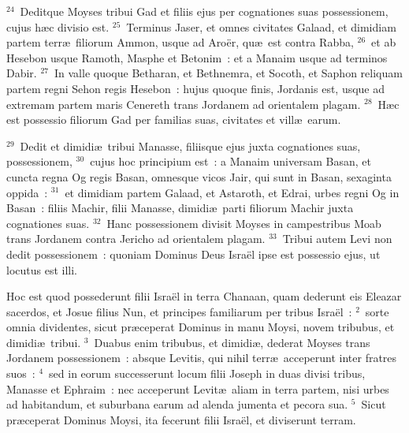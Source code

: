 ${}^{24}$~Deditque Moyses tribui Gad et filiis ejus per cognationes suas possessionem, cujus h\ae c divisio est.
${}^{25}$~Terminus Jaser, et omnes civitates Galaad, et dimidiam partem terr\ae\ filiorum Ammon, usque ad Aro\"er, qu\ae\ est contra Rabba,
${}^{26}$~et ab Hesebon usque Ramoth, Masphe et Betonim~: et a Manaim usque ad terminos Dabir.
${}^{27}$~In valle quoque Betharan, et Bethnemra, et Socoth, et Saphon reliquam partem regni Sehon regis Hesebon~: hujus quoque finis, Jordanis est, usque ad extremam partem maris Cenereth trans Jordanem ad orientalem plagam.
${}^{28}$~H\ae c est possessio filiorum Gad per familias suas, civitates et vill\ae\ earum.


${}^{29}$~Dedit et dimidi\ae\ tribui Manasse, filiisque ejus juxta cognationes suas, possessionem,
${}^{30}$~cujus hoc principium est~: a Manaim universam Basan, et cuncta regna Og regis Basan, omnesque vicos Jair, qui sunt in Basan, sexaginta oppida~:
${}^{31}$~et dimidiam partem Galaad, et Astaroth, et Edrai, urbes regni Og in Basan~: filiis Machir, filii Manasse, dimidi\ae\ parti filiorum Machir juxta cognationes suas.
${}^{32}$~Hanc possessionem divisit Moyses in campestribus Moab trans Jordanem contra Jericho ad orientalem plagam.
${}^{33}$~Tribui autem Levi non dedit possessionem~: quoniam Dominus Deus Isra\"el ipse est possessio ejus, ut locutus est illi.

\lettrine[lines=3,image=true,loversize=0.05,lraise=-0.03]{H}{}oc est quod possederunt filii Isra\"el in terra Chanaan, quam dederunt eis Eleazar sacerdos, et Josue filius Nun, et principes familiarum per tribus Isra\"el~:
${}^{2}$~sorte omnia dividentes, sicut pr\ae ceperat Dominus in manu Moysi, novem tribubus, et dimidi\ae\ tribui.
${}^{3}$~Duabus enim tribubus, et dimidi\ae , dederat Moyses trans Jordanem possessionem~: absque Levitis, qui nihil terr\ae\ acceperunt inter fratres suos~:
${}^{4}$~sed in eorum successerunt locum filii Joseph in duas divisi tribus, Manasse et Ephraim~: nec acceperunt Levit\ae\ aliam in terra partem, nisi urbes ad habitandum, et suburbana earum ad alenda jumenta et pecora sua.
${}^{5}$~Sicut pr\ae ceperat Dominus Moysi, ita fecerunt filii Isra\"el, et diviserunt terram.


